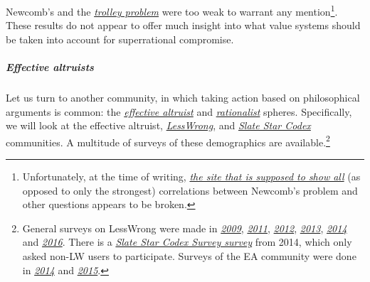 Newcomb's and the
\href{https://en.wikipedia.org/wiki/Trolley_problem}{\emph{trolley
problem}} were too weak to warrant any mention\footnote{Unfortunately,
  at the time of writing,
  \href{http://philpapers.org/surveys/linear_most_with.pl?A=main\%3ANewcomb\&flip=on\#main}{\emph{the
  site that is supposed to show all}} (as opposed to only the strongest)
  correlations between Newcomb's problem and other questions appears to
  be broken.}. These results do not appear to offer much insight into
what value systems should be taken into account for superrational
compromise.

\hypertarget{effective-altruists}{\subparagraph{Effective
altruists}\label{effective-altruists}}

Let us turn to another community, in which taking action based on
philosophical arguments is common: the
\href{https://en.wikipedia.org/wiki/Effective_altruismhttps://en.wikipedia.org/wiki/Effective_altruism}{\emph{effective
altruist}} and
\href{http://slatestarcodex.com/2014/09/05/mapmaker-mapmaker-make-me-a-map/}{\emph{rationalist}}
spheres. Specifically, we will look at the effective altruist,
\href{https://en.wikipedia.org/wiki/LessWrong}{\emph{LessWrong}}, and
\href{http://slatestarcodex.com/}{\emph{Slate Star Codex}} communities.
A multitude of surveys of these demographics are available.\footnote{General
  surveys on LessWrong were made in
  \href{http://lesswrong.com/lw/fk/survey_results/}{\emph{2009}},
  \href{http://lesswrong.com/lw/8p4/2011_survey_results/}{\emph{2011}},
  \href{http://lesswrong.com/lw/fp5/2012_survey_results/}{\emph{2012}},
  \href{http://lesswrong.com/lw/jj0/2013_survey_results/}{\emph{2013}},
  \href{http://lesswrong.com/lw/lhg/2014_survey_results/}{\emph{2014}}
  and
  \href{http://lesswrong.com/lw/nkw/2016_lesswrong_diaspora_survey_results/}{\emph{2016}}.
  There is a
  \href{http://slatestarcodex.com/2015/11/04/2014-ssc-survey-results/}{\emph{Slate
  Star Codex Survey survey}} from 2014, which only asked non-LW users to
  participate. Surveys of the EA community were done in
  \href{https://webcache.googleusercontent.com/search?q=cache:nmlsoMrw1JMJ:https://eahub.org/sites/effectivealtruismhub.com/files/survey/2014/results-and-analysis.pdf+\&cd=1\&hl=en\&ct=clnk\&gl=de}{\emph{2014}}
  and
  \href{https://eahub.org/sites/eahub.org/files/SurveyReport2015.pdf}{\emph{2015}}.}

